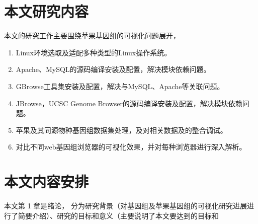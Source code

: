 	\section{本文研究内容}
	本文的研究工作主要围绕苹果基因组的可视化问题展开， 
	\begin{enumerate}
		\item Linux环境选取及适配多种类型的Linux操作系统。 
		\item  Apache、MySQL的源码编译安装及配置，解决模块依赖问题。
		\item  GBrowse工具集安装及配置，解决与MySQL、Apache等关联问题。
		\item  JBrowse，UCSC Genome Browser的源码编译安装及配置，解决模块依赖问题。
		\item 苹果及其同源物种基因组数据集处理，及对相关数据及的整合调试。
		\item 对比不同web基因组浏览器的可视化效果，并对每种浏览器进行深入解析。
	\end{enumerate}
	
	\section{本文内容安排}
	本文第 1 章是绪论， 分为研究背景（对基因组及苹果基因组的可视化研究进展进行了简要介绍）、研究的目标和意义（主要说明了本文要达到的目标和